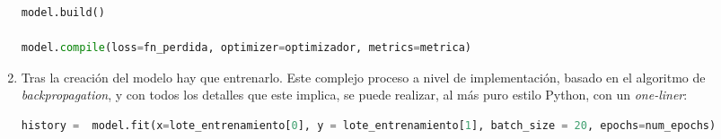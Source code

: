 \begin{enumerate}
\begin{lstlisting}[language=Python]
model.build()

model.compile(loss=fn_perdida, optimizer=optimizador, metrics=metrica)
\end{lstlisting}

    \item Tras la creación del modelo hay que entrenarlo. Este complejo proceso a nivel de implementación, basado en el algoritmo de \textit{backpropagation}, y con todos los detalles que este implica, se puede realizar, al más puro estilo Python, con un \textit{one-liner}:\medskip
\begin{lstlisting}[language=Python]
history =  model.fit(x=lote_entrenamiento[0], y = lote_entrenamiento[1], batch_size = 20, epochs=num_epochs)
\end{lstlisting}
\end{enumerate}

